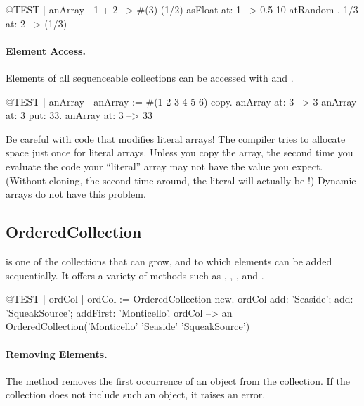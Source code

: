 \documentclass[a4paper,10pt,twoside]{book}
\begin{document}
\begin{code}{@TEST | anArray |}
{ 1 + 2 } --> #(3)
{(1/2) asFloat} at: 1 --> 0.5
{10 atRandom . 1/3} at: 2 --> (1/3)
\end{code}

\paragraph{Element Access.}
Elements of all sequenceable collections can be accessed with  and .

\begin{code}{@TEST | anArray |}
anArray := #(1 2 3 4 5 6) copy.
anArray at: 3 --> 3
anArray at: 3 put: 33.
anArray at: 3 --> 33
\end{code}

\noindent
Be careful with code that modifies literal arrays!
The compiler tries to allocate space just once for literal arrays.
Unless you copy the array, the second time you evaluate the code your ``literal'' array may not have the value you expect.
(Without cloning, the second time around, the literal  will actually be !)
Dynamic arrays do not have this problem.

\subsection{OrderedCollection}
 is one of the collections that can grow, and to which elements can be added sequentially. It offers a variety of methods such as , , , and . 

\begin{code}{@TEST | ordCol |}
ordCol := OrderedCollection new.
ordCol add: 'Seaside'; add: 'SqueakSource'; addFirst: 'Monticello'.
ordCol --> an OrderedCollection('Monticello' 'Seaside' 'SqueakSource')
\end{code}

\paragraph{Removing Elements.} The method   removes the first occurrence of an object from the collection. If the collection does not include such an object, it raises an error. 
\end{document}
